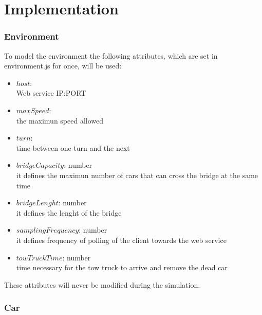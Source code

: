 \chapter{Implementation}\label{ch:implementation}

\subsection{Environment}

To model the environment the following attributes, which are set in environment.js for once, will be used:
\begin{itemize}
    \item $host$:\\ Web service IP:PORT
    \item $maxSpeed$:\\ the maximun speed allowed
    \item $turn$:\\ time between one turn and the next
    \item $bridgeCapacity$: number\\ it defines the maximun number of cars that can cross the bridge
    at the same time
    \item $bridgeLenght$: number\\ it defines the lenght of the bridge
    \item $samplingFrequency$: number\\ it defines frequency of polling of the client towards the web service
    \item $towTruckTime$: number\\ time necessary for the tow truck to arrive and remove the dead car
\end{itemize}

These attributes will never be modified during the simulation.

\subsection{Car}

